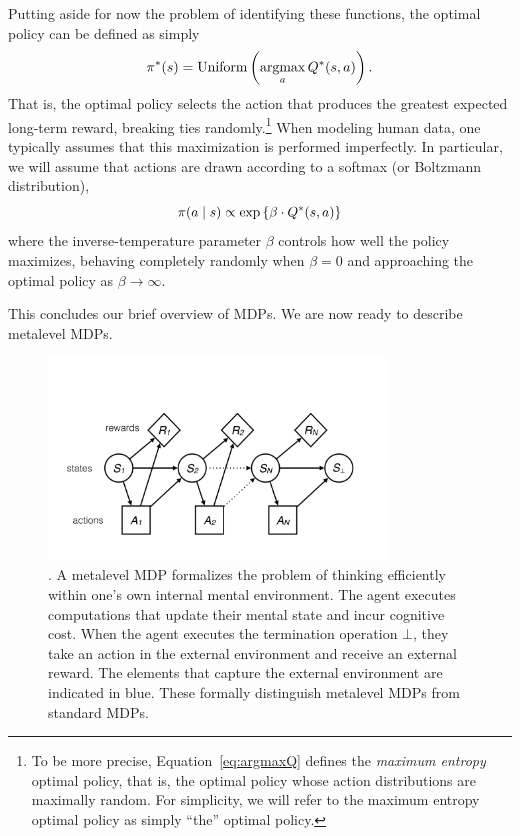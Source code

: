 Putting aside for now the problem of identifying these functions, the optimal policy can be defined as simply
%
\begin{equation}\label{eq:argmaxQ}
  \pi^*(s) = \mathrm{Uniform}\left(\operatorname*{argmax}_a Q^*(s, a)\right).
\end{equation}
%
That is, the optimal policy selects the action that produces the greatest expected long-term reward, breaking ties randomly.\footnote{%
  To be more precise, Equation~\ref{eq:argmaxQ} defines the \emph{maximum entropy} optimal policy, that is, the optimal policy whose action distributions are maximally random. For simplicity, we will refer to the maximum entropy optimal policy as simply ``the'' optimal policy.
} When modeling human data, one typically assumes that this maximization is performed imperfectly. In particular, we will assume that actions are drawn according to a softmax (or Boltzmann distribution),
%
\begin{equation}\label{eq:softoptimal}
  \pi(a \mid s) \propto \exp\left\{\beta \cdot Q^*(s, a)\right\}
\end{equation}
%
where the inverse-temperature parameter $\beta$ controls how well the policy maximizes, behaving completely randomly when $\beta = 0$ and approaching the optimal policy as $\beta \rightarrow \infty$.

This concludes our brief overview of MDPs. We are now ready to describe metalevel MDPs.


\begin{figure}
  \centering
  \includegraphics[width=0.8\textwidth,page=2,trim=0 100 0 50]{diagrams/metamdp.pdf}
  \caption{.
    A metalevel MDP formalizes the problem of thinking efficiently within one's own internal mental environment. The agent executes computations that update their mental state and incur cognitive cost. When the agent executes the termination operation $\bot$, they take an action in the external environment and receive an external reward. The elements that capture the external environment are indicated in blue. These formally distinguish metalevel MDPs from standard MDPs.
  }
  \label{fig:metamdp-diagram}
\end{figure}




